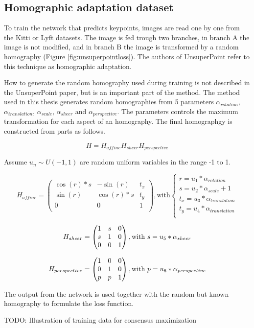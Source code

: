 \subsection{Homographic adaptation dataset}

To train the network that predicts keypoints, images are read one by one from the Kitti or Lyft datasets. The image is fed trough two branches, in branch A the image is not modified, and in branch B the image is transformed by a random homography (Figure \ref{fig:unsuperpointloss}). The authors of UnsuperPoint refer to this technique as homographic adaptation.

How to generate the random homography used during training is not described in the UnsuperPoint paper, but is an important part of the method. The method used in this thesis generates random homographies from 5 parameters $\alpha_{rotation}$, $\alpha_{translation}$, $\alpha_{scale}$, $\alpha_{sheer}$ and $\alpha_{perspective}$. The parameters controls the maximum transformation for each aspect of an homography. The final homographgy is constructed from parts as follows.

\[
H = H_{affine} H_{sheer} H_{perspective}
\]

Assume $u_n \sim U(-1,1)$ are random uniform variables in the range -1 to 1.

\[
H_{affine} = 
\begin{pmatrix}
\cos(r)*s & -\sin(r) & t_x \\
\sin(r)& \cos(r)*s & t_y \\
0 & 0 & 1 \\
\end{pmatrix}
, \text{with}
\begin{cases}
r=u_1*\alpha_{rotation} \\
s=u_2*\alpha_{scale}+1 \\
t_x=u_3*\alpha_{translation} \\
t_y=u_4*\alpha_{translation} \\
\end{cases}
\]

\[
H_{sheer} = 
\begin{pmatrix}
1 & s & 0 \\
s & 1 & 0 \\
0 & 0 & 1 \\
\end{pmatrix}
, \text{with}
\ s=u_5*\alpha_{sheer} \\
\]

\[
H_{perspective} = 
\begin{pmatrix}
1 & 0 & 0 \\
0 & 1 & 0 \\
p & p & 1 \\
\end{pmatrix}
, \text{with}
\ p=u_6*\alpha_{perspective} \\
\]

The output from the network is used together with the random but known homography to formulate the loss function.

TODO: Illustration of training data for consensus maximization

